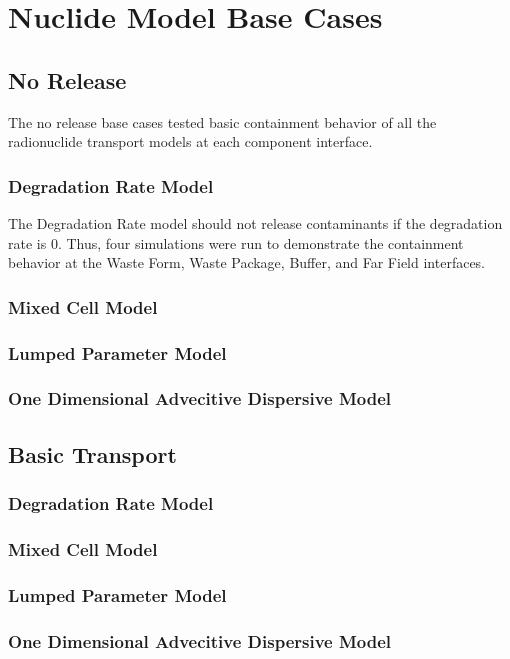 \section{Nuclide Model Base Cases}\label{sec:nuclide_base_cases}
\subsection{No Release}
The no release base cases tested basic containment behavior of all the 
radionuclide transport models at each component interface. 

\subsubsection{Degradation Rate Model}
The Degradation Rate model should not release contaminants if the degradation 
rate is 0. Thus, four simulations were run to demonstrate the containment 
behavior at the Waste Form, Waste Package, Buffer, and Far Field interfaces. 




\subsubsection{Mixed Cell Model}



\subsubsection{Lumped Parameter Model}



\subsubsection{One Dimensional Advecitive Dispersive Model}



\subsection{Basic Transport}

\subsubsection{Degradation Rate Model}



\subsubsection{Mixed Cell Model}



\subsubsection{Lumped Parameter Model}



\subsubsection{One Dimensional Advecitive Dispersive Model}


